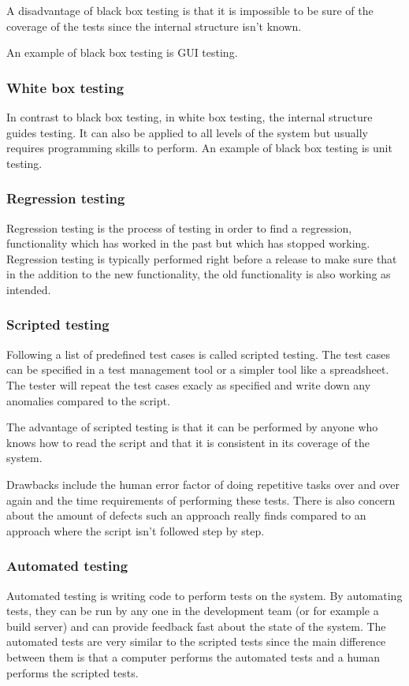 \documentclass{article}
\begin{document}
			A disadvantage of black box testing is that it is impossible to be sure of the coverage of the tests since the internal structure isn't known.

			An example of black box testing is GUI testing.

			\subsubsection{White box testing}
			In contrast to black box testing, in white box testing, the internal structure guides testing. It can also be applied to all levels of the system but usually requires programming skills to perform. An example of black box testing is unit testing.

			\subsubsection{Regression testing}
			Regression testing is the process of testing in order to find a regression, functionality which has worked in the past but which has stopped working. Regression testing is typically performed right before a release to make sure that in the addition to the new functionality, the old functionality is also working as intended.
			
			\subsubsection{Scripted testing}
			Following a list of predefined test cases is called scripted testing. The test cases can be specified in a test management tool or a simpler tool like a spreadsheet. The tester will repeat the test cases exacly as specified and write down any anomalies compared to the script. 
			
			The advantage of scripted testing is that it can be performed by anyone who knows how to read the script and that it is consistent in its coverage of the system. 
			
			Drawbacks include the human error factor of doing repetitive tasks over and over again and the time requirements of performing these tests. There is also concern about the amount of defects such an approach really finds compared to an approach where the script isn't followed step by step. \cite{snakeoil} 

			\subsubsection{Automated testing}
			Automated testing is writing code to perform tests on the system. By automating tests, they can be run by any one in the development team (or for example a build server) and can provide feedback fast about the state of the system. The automated tests are very similar to the scripted tests since the main difference between them is that a computer performs the automated tests and a human performs the scripted tests. 
			
\end{document}
